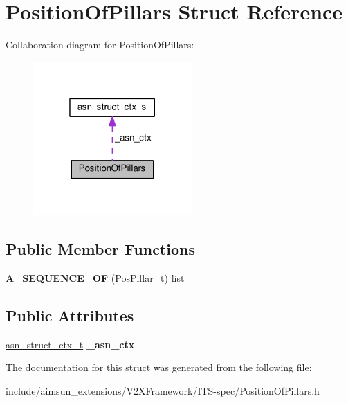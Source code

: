\hypertarget{structPositionOfPillars}{}\section{Position\+Of\+Pillars Struct Reference}
\label{structPositionOfPillars}


Collaboration diagram for Position\+Of\+Pillars\+:\nopagebreak
\begin{figure}[H]
\begin{center}
\leavevmode
\includegraphics[width=172pt]{structPositionOfPillars__coll__graph}
\end{center}
\end{figure}
\subsection*{Public Member Functions}
\begin{DoxyCompactItemize}
\item 
{\bfseries A\+\_\+\+S\+E\+Q\+U\+E\+N\+C\+E\+\_\+\+OF} (Pos\+Pillar\+\_\+t) list\hypertarget{structPositionOfPillars_a4575458dade19c0ee8b6dd59f8412c1c}{}\label{structPositionOfPillars_a4575458dade19c0ee8b6dd59f8412c1c}

\end{DoxyCompactItemize}
\subsection*{Public Attributes}
\begin{DoxyCompactItemize}
\item 
\hyperlink{structasn__struct__ctx__s}{asn\+\_\+struct\+\_\+ctx\+\_\+t} {\bfseries \+\_\+asn\+\_\+ctx}\hypertarget{structPositionOfPillars_a18dcc9d2fb3267308cd9fee11d49f237}{}\label{structPositionOfPillars_a18dcc9d2fb3267308cd9fee11d49f237}

\end{DoxyCompactItemize}


The documentation for this struct was generated from the following file\+:\begin{DoxyCompactItemize}
\item 
include/aimsun\+\_\+extensions/\+V2\+X\+Framework/\+I\+T\+S-\/spec/Position\+Of\+Pillars.\+h\end{DoxyCompactItemize}
